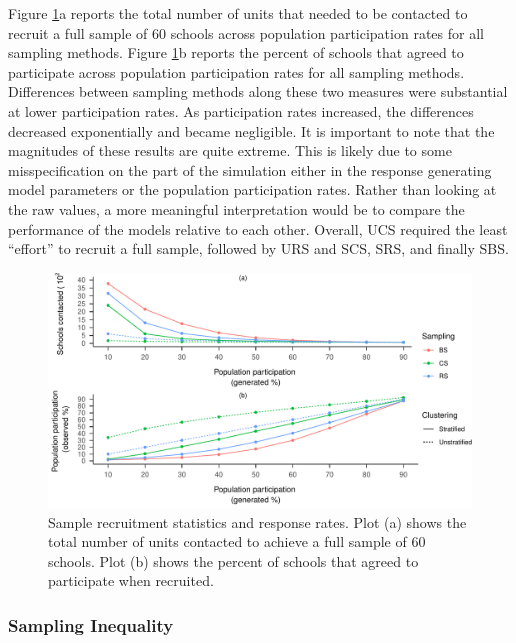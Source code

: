 \documentclass[english,man,floatsintext]{apa6}
\begin{document}
Figure \ref{fig:fig-responses}a reports the total number of units that needed to be contacted to recruit a full sample of 60 schools across population participation rates for all sampling methods. Figure \ref{fig:fig-responses}b reports the percent of schools that agreed to participate across population participation rates for all sampling methods. Differences between sampling methods along these two measures were substantial at lower participation rates. As participation rates increased, the differences decreased exponentially and became negligible. It is important to note that the magnitudes of these results are quite extreme. This is likely due to some misspecification on the part of the simulation either in the response generating model parameters or the population participation rates. Rather than looking at the raw values, a more meaningful interpretation would be to compare the performance of the models relative to each other. Overall, UCS required the least \enquote{effort} to recruit a full sample, followed by URS and SCS, SRS, and finally SBS.



\begin{figure}
\centering
\includegraphics{6---Paper_files/figure-latex/fig-responses-1.pdf}
\caption{\label{fig:fig-responses}Sample recruitment statistics and response rates. Plot (a) shows the total number of units contacted to achieve a full sample of 60 schools. Plot (b) shows the percent of schools that agreed to participate when recruited.}
\end{figure}

\hypertarget{sampling-inequality-1}{%
\subsubsection{Sampling Inequality}\label{sampling-inequality-1}}
\end{document}
